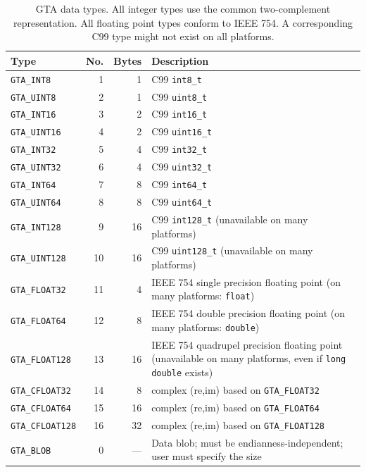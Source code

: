 \documentclass[a4paper,11pt]{article}
\newcommand{\code}[1]{\texttt{#1}}
\begin{document}
\begin{table}
\begin{tabular}{l|r|r|p{}}
Type & No. & Bytes & Description\\\hline
\code{GTA\_INT8}      &  1 & 1		& C99 \code{int8\_t}		\\
\code{GTA\_UINT8}     &  2 & 1 		& C99 \code{uint8\_t}		\\
\code{GTA\_INT16}     &  3 & 2 		& C99 \code{int16\_t}		\\
\code{GTA\_UINT16}    &  4 & 2 		& C99 \code{uint16\_t} 	\\
\code{GTA\_INT32}     &  5 & 4 		& C99 \code{int32\_t}		\\
\code{GTA\_UINT32}    &  6 & 4 		& C99 \code{uint32\_t}		\\
\code{GTA\_INT64}     &  7 & 8 		& C99 \code{int64\_t} 		\\
\code{GTA\_UINT64}    &  8 & 8 		& C99 \code{uint64\_t}		\\
\code{GTA\_INT128}    &  9 & 16		& C99 \code{int128\_t} (unavailable on many platforms)		\\
\code{GTA\_UINT128}   & 10 & 16		& C99 \code{uint128\_t} (unavailable on many platforms)		\\
\code{GTA\_FLOAT32}   & 11 & 4 		& IEEE 754 single precision floating point (on many platforms: \code{float}) \\
\code{GTA\_FLOAT64}   & 12 & 8 		& IEEE 754 double precision floating point (on many platforms: \code{double}) \\
\code{GTA\_FLOAT128}  & 13 & 16		& IEEE 754 quadrupel precision floating point (unavailable on many platforms, even if \code{long double} exists) \\
\code{GTA\_CFLOAT32}  & 14 & 8		& complex (re,im) based on \code{GTA\_FLOAT32} \\
\code{GTA\_CFLOAT64}  & 15 & 16		& complex (re,im) based on \code{GTA\_FLOAT64} \\
\code{GTA\_CFLOAT128} & 16 & 32		& complex (re,im) based on \code{GTA\_FLOAT128} \\
\code{GTA\_BLOB}      &  0 & ---    	& Data blob; must be endianness-independent; user must specify the size \\
\end{tabular}
\caption{GTA data types. All integer types use the common two-complement
representation. All floating point types conform to IEEE 754. A corresponding
C99 type might not exist on all platforms.}
\label{tab:types}
\end{table}
\end{document}

